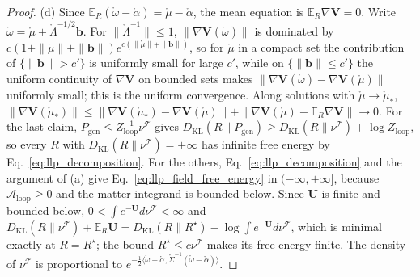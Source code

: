 \begin{proof}
(d) Since $\mathbb E_R(\mathring\omega-\mathring\alpha)=\mathring\mu-\mathring\alpha$, the mean equation is $\mathbb E_R\nabla\mathbf V=0$. Write $\mathring\omega=\mathring\mu+\mathring\Lambda^{-1/2}\mathbf b$. For $\|\mathring\Lambda^{-1}\|\leq1$, $\|\nabla\mathbf V(\mathring\omega)\|$ is dominated by $c(1+\|\mathring\mu\|+\|\mathbf b\|)e^{c(\|\mathring\mu\|+\|\mathbf b\|)}$, so for $\mathring\mu$ in a compact set the contribution of $\{\|\mathbf b\|>c'\}$ is uniformly small for large $c'$, while on $\{\|\mathbf b\|\leq c'\}$ the uniform continuity of $\nabla\mathbf V$ on bounded sets makes $\|\nabla\mathbf V(\mathring\omega)-\nabla\mathbf V(\mathring\mu)\|$ uniformly small; this is the uniform convergence. Along solutions with $\mathring\mu\to\mathring\mu_*$, $\|\nabla\mathbf V(\mathring\mu_*)\|\leq\|\nabla\mathbf V(\mathring\mu_*)-\nabla\mathbf V(\mathring\mu)\|+\|\nabla\mathbf V(\mathring\mu)-\mathbb E_R\nabla\mathbf V\|\to0$. For the last claim, $P_{\mathrm{gen}}\leq Z_{\mathrm{loop}}^{-1}\nu^{\mathcal T}$ gives $D_{\mathrm{KL}}(R\|P_{\mathrm{gen}})\geq D_{\mathrm{KL}}(R\|\nu^{\mathcal T})+\log Z_{\mathrm{loop}}$, so every $R$ with $D_{\mathrm{KL}}(R\|\nu^{\mathcal T})=+\infty$ has infinite free energy by Eq.~\eqref{eq:llp_decomposition}. For the others, Eq.~\eqref{eq:llp_decomposition} and the argument of (a) give Eq.~\eqref{eq:llp_field_free_energy} in $(-\infty,+\infty]$, because $\mathcal A_{\mathrm{loop}}\geq0$ and the matter integrand is bounded below. Since $\mathbf U$ is finite and bounded below, $0<\int e^{-\mathbf U}d\nu^{\mathcal T}<\infty$ and $D_{\mathrm{KL}}(R\|\nu^{\mathcal T})+\mathbb E_R\mathbf U=D_{\mathrm{KL}}(R\|R^\star)-\log\int e^{-\mathbf U}d\nu^{\mathcal T}$, which is minimal exactly at $R=R^\star$; the bound $R^\star\leq c\nu^{\mathcal T}$ makes its free energy finite. The density of $\nu^{\mathcal T}$ is proportional to $e^{-\frac12\langle\mathring\omega-\mathring\alpha,\mathring\Sigma^{-1}(\mathring\omega-\mathring\alpha)\rangle}$.
\end{proof}

